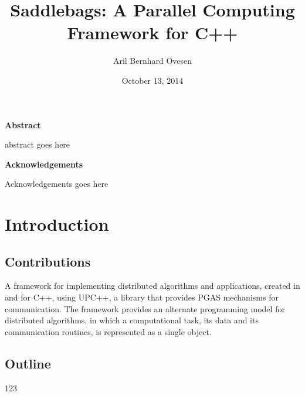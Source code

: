 \documentclass{uit-report}
\begin{document}
\title{Saddlebags: A Parallel Computing Framework for C++}
\subtitle{}
\author{Aril Bernhard Ovesen}
\date{October 13, 2014}

\maketitle



\newpage
\thispagestyle{empty}
\mbox{}

\pagebreak
\thispagestyle{empty}
\textbf{Abstract}

abstract goes here


\newpage
\thispagestyle{empty}
\textbf{Acknowledgements}

Acknowledgements goes here


\newpage
\thispagestyle{empty}
\tableofcontents
\pagebreak

\newpage
\thispagestyle{fancyplain}
\section{Introduction}





\subsection{Contributions}
A framework for implementing distributed algorithms and applications, created in and for C++, using UPC++, a library that provides PGAS mechanisms for communication. The framework provides an alternate programming model for distributed algorithms, in which a computational task, its data and its communication routines, is represented as a single object. 



\subsection{Outline}
123
\end{document}
